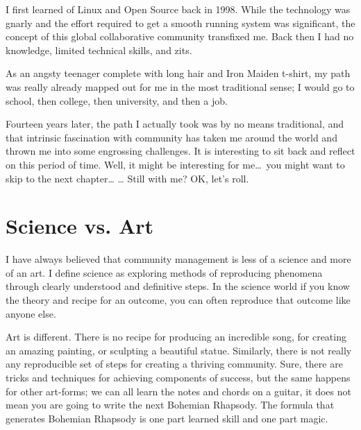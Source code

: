 

I first learned of Linux and Open Source back in 1998. While the technology was
gnarly and the effort required to get a smooth running system was significant,
the concept of this global collaborative community transfixed me. Back then I
had no knowledge, limited technical skills, and zits.

As an angsty teenager complete with long hair and Iron Maiden t-shirt, my path
was really already mapped out for me in the most traditional sense; I would go
to school, then college, then university, and then a job.

Fourteen years later, the path I actually took was by no means traditional, and
that intrinsic fascination with community has taken me around the world and
thrown me into some engrossing challenges. It is interesting to sit back and
reflect on this period of time. Well, it might be interesting for me\dots\ you
might want to skip to the next chapter\dots 
\newline
\dots
\newline
Still with me? OK, let’s roll.

\section*{Science vs. Art}

I have always believed that community management is less of a science and more
of an art. I define science as exploring methods of reproducing phenomena
through clearly understood and definitive steps. In the science world if you
know the theory and recipe for an outcome, you can often reproduce that outcome
like anyone else.

Art is different. There is no recipe for producing an incredible song, for
creating an amazing painting, or sculpting a beautiful statue. Similarly, there
is not really any reproducible set of steps for creating a thriving community.
Sure, there are tricks and techniques for achieving components of success, but
the same happens for other art-forms; we can all learn the notes and chords on a
guitar, it does not mean you are going to write the next Bohemian Rhapsody. The
formula that generates Bohemian Rhapsody is one part learned skill and one part
magic.

